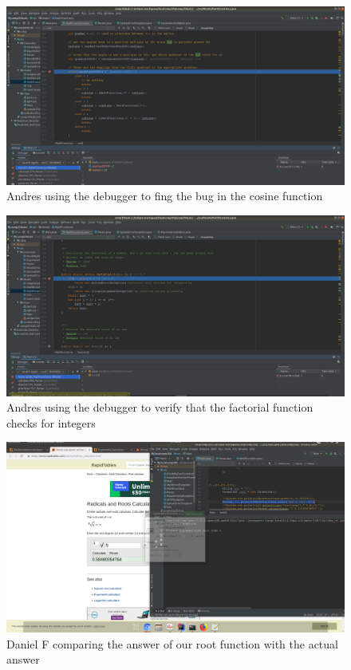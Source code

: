 \documentclass[a4paper, 12pt]{article}
\begin{document}
\vspace{20mm}
\begin{figure}[H]
\centering
\includegraphics[width=1.13\textwidth]{Andres1.png}
\caption{Andres using the debugger to fing the bug in the cosine function}
\label{Andres1}
\end{figure}


\vspace{20mm}
\begin{figure}[H]
\centering
\includegraphics[width=1.13\textwidth]{Andres2.png}
\caption{Andres using the debugger to verify that the factorial function checks for integers}
\label{Andres2}
\end{figure}

\vspace{20mm}
\begin{figure}[H]
\centering
\includegraphics[width=1.13\textwidth]{Dany1.png}
\caption{Daniel F comparing the answer of our root function with the actual answer}
\label{Dany1}
\end{figure}
\end{document}

